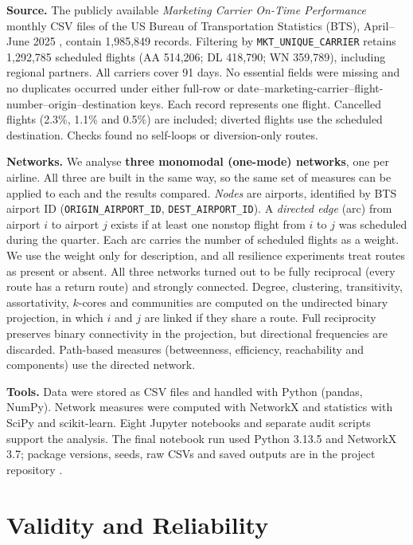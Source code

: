 \documentclass[12pt, a4paper]{article}
\begin{document}
\textbf{Source.} The publicly available \emph{Marketing Carrier On-Time Performance} monthly CSV files of the US Bureau of Transportation Statistics (BTS), April--June 2025 \cite{bts}, contain 1,985,849 records. Filtering by \texttt{MKT\_UNIQUE\_CARRIER} retains 1,292,785 scheduled flights (AA 514,206; DL 418,790; WN 359,789), including regional partners. All carriers cover 91 days. No essential fields were missing and no duplicates occurred under either full-row or date--marketing-carrier--flight-number--origin--destination keys. Each record represents one flight. Cancelled flights (2.3\%, 1.1\% and 0.5\%) are included; diverted flights use the scheduled destination. Checks found no self-loops or diversion-only routes.

\textbf{Networks.} We analyse \textbf{three monomodal (one-mode) networks}, one per
airline. All three are built in the same way, so the same set of measures can be
applied to each and the results compared. \emph{Nodes} are airports, identified by BTS
airport ID (\texttt{ORIGIN\_AIRPORT\_ID}, \texttt{DEST\_AIRPORT\_ID}). A \emph{directed edge} (arc) from airport $i$ to airport $j$ exists if at
least one nonstop flight from $i$ to $j$ was scheduled during the quarter. Each arc
carries the number of scheduled flights as a weight. We use the weight only for
description, and all resilience experiments treat routes as present or absent. All
three networks turned out to be fully reciprocal (every route has a return route) and
strongly connected. Degree, clustering, transitivity, assortativity, $k$-cores and
communities are computed on the undirected binary projection, in which $i$ and $j$
are linked if they share a route. Full reciprocity preserves binary connectivity in the projection, but directional frequencies are discarded. Path-based measures (betweenness, efficiency, reachability and
components) use the directed network.

\textbf{Tools.} Data were stored as CSV files and handled with Python (pandas, NumPy).
Network measures were computed with NetworkX \cite{networkx} and statistics with SciPy
and scikit-learn. Eight Jupyter notebooks and separate audit scripts support the analysis. The final notebook run used Python 3.13.5 and NetworkX 3.7; package versions, seeds, raw CSVs and saved outputs are in the project repository \cite{repo}.

\section{Validity and Reliability}
\label{validity-and-reliability}
\end{document}
